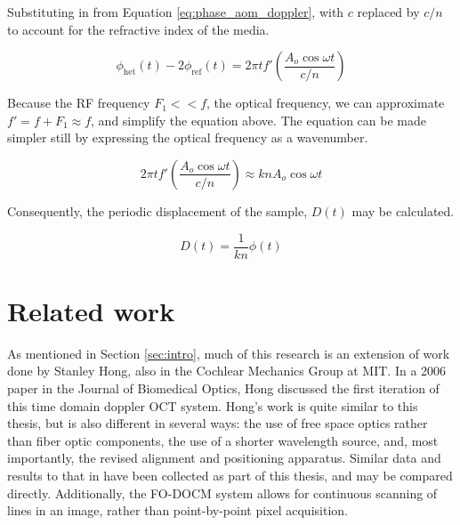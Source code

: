 Substituting in from Equation \ref{eq:phase_aom_doppler}, with $c$ replaced by $c/n$ to account for the refractive index of the media.

\begin{equation}
\phi_{\mathrm{het}}(t) - 2 \phi_{\mathrm{ref}}(t) = 2 \pi t f'  \left( \frac{A_o \cos{\omega t}}{c/n} \right)
\end{equation}

Because the RF frequency $F_1 << f$, the optical frequency, we can approximate $f' = f + F_1 \approx f$, and simplify the equation above. The equation can be made simpler still by expressing the optical frequency as a wavenumber.

\begin{equation}
2 \pi t f'  \left( \frac{A_o \cos{\omega t}}{c/n} \right) \approx k n A_o \cos{\omega t}
\end{equation}

Consequently, the periodic displacement of the sample, $D(t)$ may be calculated.


\begin{equation}
D(t) = \frac{1}{kn} \phi(t)
\end{equation}

\section{Related work}

As mentioned in Section \ref{sec:intro}, much of this research is an extension of work done by Stanley Hong, also in the Cochlear Mechanics Group at MIT. In a 2006 paper in the Journal of Biomedical Optics, Hong discussed the first iteration of this time domain doppler OCT system. \cite{hong} Hong's work is quite similar to this thesis, but is also different in several ways: the use of free space optics rather than fiber optic components, the use of a shorter wavelength source, and, most importantly, the revised alignment and positioning apparatus. Similar data and results to that in \cite{hong} have been collected as part of this thesis, and may be compared directly. Additionally, the FO-DOCM system allows for continuous scanning of lines in an image, rather than point-by-point pixel acquisition.


